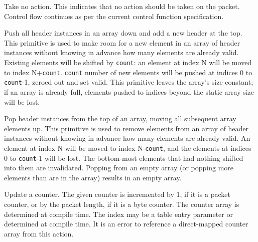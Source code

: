 \documentclass[12pt]{article}
\begin{document}
{ %
Take no action.
}
{ %
}
{ %
This indicates that no action should be taken on the packet. Control flow
continues as per the current control function specification.
}


{ %
Push all header instances in an array down and add a new header at the top.
}
{ %
}
{ %
This primitive is used to make room for a new element in an array of header
instances without knowing in advance how many elements are already valid.
Existing elements will be shifted by \texttt{count}: an
element at index N will be moved to index N+\texttt{count}.
\texttt{count} number of new elements will be pushed at indices 0 to
\texttt{count}-1, zeroed out and set valid.
This primitive leaves the array's size constant; if an array is already full,
elements pushed to indices beyond the static array size will be lost.
}


{ %
Pop header instances from the top of an array, moving all subsequent array elements up.
}
{ %
}
{ %
This primitive is used to remove elements from an array of header instances
without knowing in advance how many elements are already valid. An element at
index N will be moved to index N-\texttt{count}, and the elements at indices 0 to
\texttt{count}-1 will be lost. The bottom-most elements that had nothing
shifted into them are invalidated.
Popping from an empty array (or popping more elements than are in the array)
results in an empty array.
}


{ %
Update a counter.
}
{ %
}
{ %
The given counter is incremented by 1, if it is a packet counter, or by the
packet length, if it is a byte counter.  The counter array is determined
at compile time.  The index may be a table entry parameter or determined at
compile time. It is an error to reference a direct-mapped counter array from
this action.
}
\end{document}
